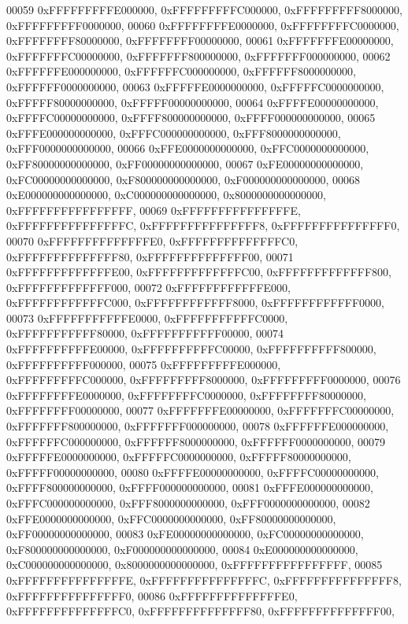 \begin{DoxyCode}
00059         0xFFFFFFFFFE000000, 0xFFFFFFFFFC000000, 0xFFFFFFFFF8000000, 0xFFFFFFFFF0000000,
00060         0xFFFFFFFFE0000000, 0xFFFFFFFFC0000000, 0xFFFFFFFF80000000, 0xFFFFFFFF00000000,
00061         0xFFFFFFFE00000000, 0xFFFFFFFC00000000, 0xFFFFFFF800000000, 0xFFFFFFF000000000,
00062         0xFFFFFFE000000000, 0xFFFFFFC000000000, 0xFFFFFF8000000000, 0xFFFFFF0000000000,
00063         0xFFFFFE0000000000, 0xFFFFFC0000000000, 0xFFFFF80000000000, 0xFFFFF00000000000,
00064         0xFFFFE00000000000, 0xFFFFC00000000000, 0xFFFF800000000000, 0xFFFF000000000000,
00065         0xFFFE000000000000, 0xFFFC000000000000, 0xFFF8000000000000, 0xFFF0000000000000,
00066         0xFFE0000000000000, 0xFFC0000000000000, 0xFF80000000000000, 0xFF00000000000000,
00067         0xFE00000000000000, 0xFC00000000000000, 0xF800000000000000, 0xF000000000000000,
00068         0xE000000000000000, 0xC000000000000000, 0x8000000000000000, 0xFFFFFFFFFFFFFFFF,
00069         0xFFFFFFFFFFFFFFFE, 0xFFFFFFFFFFFFFFFC, 0xFFFFFFFFFFFFFFF8, 0xFFFFFFFFFFFFFFF0,
00070         0xFFFFFFFFFFFFFFE0, 0xFFFFFFFFFFFFFFC0, 0xFFFFFFFFFFFFFF80, 0xFFFFFFFFFFFFFF00,
00071         0xFFFFFFFFFFFFFE00, 0xFFFFFFFFFFFFFC00, 0xFFFFFFFFFFFFF800, 0xFFFFFFFFFFFFF000,
00072         0xFFFFFFFFFFFFE000, 0xFFFFFFFFFFFFC000, 0xFFFFFFFFFFFF8000, 0xFFFFFFFFFFFF0000,
00073         0xFFFFFFFFFFFE0000, 0xFFFFFFFFFFFC0000, 0xFFFFFFFFFFF80000, 0xFFFFFFFFFFF00000,
00074         0xFFFFFFFFFFE00000, 0xFFFFFFFFFFC00000, 0xFFFFFFFFFF800000, 0xFFFFFFFFFF000000,
00075         0xFFFFFFFFFE000000, 0xFFFFFFFFFC000000, 0xFFFFFFFFF8000000, 0xFFFFFFFFF0000000,
00076         0xFFFFFFFFE0000000, 0xFFFFFFFFC0000000, 0xFFFFFFFF80000000, 0xFFFFFFFF00000000,
00077         0xFFFFFFFE00000000, 0xFFFFFFFC00000000, 0xFFFFFFF800000000, 0xFFFFFFF000000000,
00078         0xFFFFFFE000000000, 0xFFFFFFC000000000, 0xFFFFFF8000000000, 0xFFFFFF0000000000,
00079         0xFFFFFE0000000000, 0xFFFFFC0000000000, 0xFFFFF80000000000, 0xFFFFF00000000000,
00080         0xFFFFE00000000000, 0xFFFFC00000000000, 0xFFFF800000000000, 0xFFFF000000000000,
00081         0xFFFE000000000000, 0xFFFC000000000000, 0xFFF8000000000000, 0xFFF0000000000000,
00082         0xFFE0000000000000, 0xFFC0000000000000, 0xFF80000000000000, 0xFF00000000000000,
00083         0xFE00000000000000, 0xFC00000000000000, 0xF800000000000000, 0xF000000000000000,
00084         0xE000000000000000, 0xC000000000000000, 0x8000000000000000, 0xFFFFFFFFFFFFFFFF,
00085         0xFFFFFFFFFFFFFFFE, 0xFFFFFFFFFFFFFFFC, 0xFFFFFFFFFFFFFFF8, 0xFFFFFFFFFFFFFFF0,
00086         0xFFFFFFFFFFFFFFE0, 0xFFFFFFFFFFFFFFC0, 0xFFFFFFFFFFFFFF80, 0xFFFFFFFFFFFFFF00,

\end{DoxyCode}
